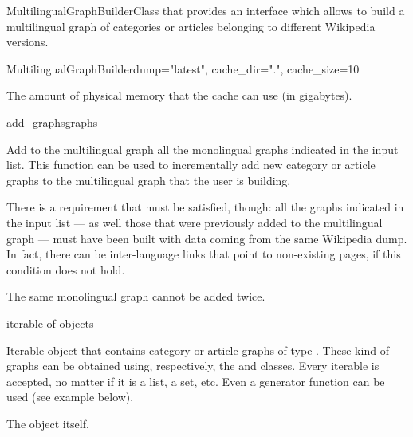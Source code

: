 \begin{classdoc}{MultilingualGraphBuilder}{Class that provides an interface which allows to build a multilingual graph of categories or articles belonging to different Wikipedia versions.}
\begin{classmethod}{MultilingualGraphBuilder}{dump="latest", cache\_dir=".", cache\_size=10}
\begin{functionparameters}
                        The amount of physical memory that the cache can use (in gigabytes).
                    \end{functionparameters}
                \end{classmethod}
                \item \begin{classmethod}{add\_graphs}{graphs}
                
                    \begin{functiondescription}
                        Add to the multilingual graph all the monolingual graphs indicated in the input list. This function can be used to incrementally add new category or article graphs to the multilingual graph that the user is building.
                        
                        There is a requirement that must be satisfied, though: all the graphs indicated in the input list --- as well those that were previously added to the multilingual graph --- must have been built with data coming from the same Wikipedia dump. In fact, there can be inter-language links that point to non-existing pages, if this condition does not hold.
                        
                        The same monolingual graph cannot be added twice.
                    \end{functiondescription}
                    
                    \begin{functionparameters}
                        \item[graphs] iterable of  objects
                        
                        Iterable object that contains category or article graphs of type . These kind of graphs can be obtained using, respectively, the  and  classes. Every iterable is accepted, no matter if it is a list, a set, etc. Even a generator function can be used (see example below).
                    \end{functionparameters}
                    
                    \begin{functionoutput}
                        The  object itself.
                    \end{functionoutput}
                    

\end{classmethod}
\end{classdoc}
